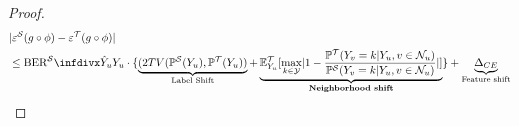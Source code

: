 \begin{proof}




\vspace{-6mm}
\begin{align*}
&\abs{\errors(g \circ \phi) - \errort(g \circ \phi)} 
\\
&\leq  
\balerrorrate{\predy_u}{\rvY_u}\cdot
    \cbrace{\underbrace{
    \rpar{2TV(\probs(\rvY_u), \probt(\rvY_u)}
    }_{\text{Label Shift}}
    +\underbrace{\E_{Y_u}^\gT\spar{\max_{k\in \gY} \abs{1-\frac{\probt(Y_v=k|Y_u,v\in \neighbor_u)}{\probs(Y_v=k|Y_u,v\in \neighbor_u)}}}  }_{\textbf{Neighborhood shift}}}
    + \underbrace{\Delta_{CE}}_{\text{Feature shift}}
    \vspace{-2mm}
\end{align*}










\end{proof}
